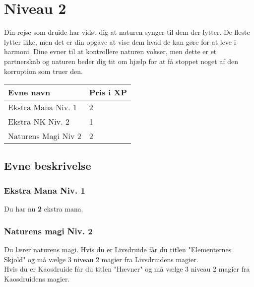 \chapter*{Niveau 2}

Din rejse som druide har vidst dig at naturen synger til dem der lytter. De fleste lytter ikke, men det er din opgave at vise dem hvad de kan gøre for at leve i harmoni. Dine evner til at kontrollere naturen vokser, men dette er et partnerskab og naturen beder dig tit om hjælp for at få stoppet noget af den korruption som truer den.

\begin{table}[H]
    \centering
    \begin{tabular}{|p{}|p{}|}
    \rowcolor{cerulean!80}\hline
        Evne navn & Pris i XP \\\hline
        Ekstra Mana Niv. 1 & 2\\\hline
        Ekstra NK Niv. 2 & 1\\\hline
        Naturens Magi Niv 2 & 2\\\hline
    \end{tabular}
\end{table}
\section*{Evne beskrivelse}

\subsection*{Ekstra Mana Niv. 1} 
Du har nu \textbf{2} ekstra mana.



\subsection*{Naturens magi Niv. 2}
Du lærer naturens magi. Hvis du er Livsdruide får du titlen "Elementernes Skjold" og må vælge 3 niveau 2 magier fra Livsdruidens magier.\\ Hvis du er Kaosdruide får du titlen "Hævner" og må vælge 3 niveau 2 magier fra Kaosdruidens magier.\\